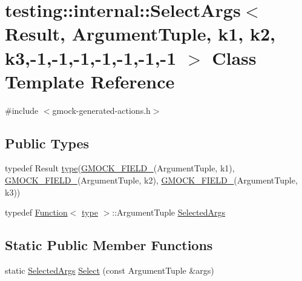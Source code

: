 \hypertarget{classtesting_1_1internal_1_1_select_args_3_01_result_00_01_argument_tuple_00_01k1_00_01k2_00_01k662b7b95311371409ab0c0d22a638b79}{}\section{testing\+:\+:internal\+:\+:Select\+Args$<$ Result, Argument\+Tuple, k1, k2, k3,-\/1,-\/1,-\/1,-\/1,-\/1,-\/1,-\/1 $>$ Class Template Reference}
\label{classtesting_1_1internal_1_1_select_args_3_01_result_00_01_argument_tuple_00_01k1_00_01k2_00_01k662b7b95311371409ab0c0d22a638b79}


{\ttfamily \#include $<$gmock-\/generated-\/actions.\+h$>$}

\subsection*{Public Types}
\begin{DoxyCompactItemize}
\item 
typedef Result \hyperlink{classtesting_1_1internal_1_1_select_args_3_01_result_00_01_argument_tuple_00_01k1_00_01k2_00_01k662b7b95311371409ab0c0d22a638b79_a119de974a2cbe11218028beb465aa012}{type}(\hyperlink{gmock-generated-actions_8h_a6eb3ce92b0613603057a20ec9e593317}{G\+M\+O\+C\+K\+\_\+\+F\+I\+E\+L\+D\+\_\+}(Argument\+Tuple, k1), \hyperlink{gmock-generated-actions_8h_a6eb3ce92b0613603057a20ec9e593317}{G\+M\+O\+C\+K\+\_\+\+F\+I\+E\+L\+D\+\_\+}(Argument\+Tuple, k2), \hyperlink{gmock-generated-actions_8h_a6eb3ce92b0613603057a20ec9e593317}{G\+M\+O\+C\+K\+\_\+\+F\+I\+E\+L\+D\+\_\+}(Argument\+Tuple, k3))
\item 
typedef \hyperlink{structtesting_1_1internal_1_1_function}{Function}$<$ \hyperlink{classtesting_1_1internal_1_1_select_args_3_01_result_00_01_argument_tuple_00_01k1_00_01k2_00_01k662b7b95311371409ab0c0d22a638b79_a119de974a2cbe11218028beb465aa012}{type} $>$\+::Argument\+Tuple \hyperlink{classtesting_1_1internal_1_1_select_args_3_01_result_00_01_argument_tuple_00_01k1_00_01k2_00_01k662b7b95311371409ab0c0d22a638b79_a3c328563b5d89854bf85a03004fd2f88}{Selected\+Args}
\end{DoxyCompactItemize}
\subsection*{Static Public Member Functions}
\begin{DoxyCompactItemize}
\item 
static \hyperlink{classtesting_1_1internal_1_1_select_args_3_01_result_00_01_argument_tuple_00_01k1_00_01k2_00_01k662b7b95311371409ab0c0d22a638b79_a3c328563b5d89854bf85a03004fd2f88}{Selected\+Args} \hyperlink{classtesting_1_1internal_1_1_select_args_3_01_result_00_01_argument_tuple_00_01k1_00_01k2_00_01k662b7b95311371409ab0c0d22a638b79_a80d2e8ee92217dfa3eb4154604a66815}{Select} (const Argument\+Tuple \&args)
\end{DoxyCompactItemize}


